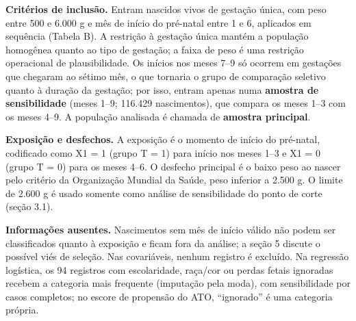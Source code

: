 \documentclass[10pt,a4paper]{article}
\begin{document}
{\color{iptescuro}\bfseries Critérios de inclusão.} Entram nascidos vivos de gestação única, com peso entre 500 e 6.000 g e mês de início do pré-natal entre 1 e 6, aplicados em sequência (Tabela B). A restrição à gestação única mantém a população homogênea quanto ao tipo de gestação; a faixa de peso é uma restrição operacional de plausibilidade. Os inícios nos meses 7--9 só ocorrem em gestações que chegaram ao sétimo mês, o que tornaria o grupo de comparação seletivo quanto à duração da gestação; por isso, entram apenas numa \textbf{amostra de sensibilidade} (meses 1--9; 116.429 nascimentos), que compara os meses 1--3 com os meses 4--9. A população analisada é chamada de \textbf{amostra principal}.\par

{\color{iptescuro}\bfseries Exposição e desfechos.} A exposição é o momento de início do pré-natal, codificado como X1 = 1 (grupo T = 1) para início nos meses 1--3 e X1 = 0 (grupo T = 0) para os meses 4--6. O desfecho principal é o baixo peso ao nascer pelo critério da Organização Mundial da Saúde, peso inferior a 2.500 g. O limite de 2.600 g é usado somente como análise de sensibilidade do ponto de corte (seção 3.1).\par

{\color{iptescuro}\bfseries Informações ausentes.} Nascimentos sem mês de início válido não podem ser classificados quanto à exposição e ficam fora da análise; a seção 5 discute o possível viés de seleção. Nas covariáveis, nenhum registro é excluído. Na regressão logística, os 94 registros com escolaridade, raça/cor ou perdas fetais ignoradas recebem a categoria mais frequente (imputação pela moda), com sensibilidade por casos completos; no escore de propensão do ATO, ``ignorado'' é uma categoria própria.\par
\end{document}
